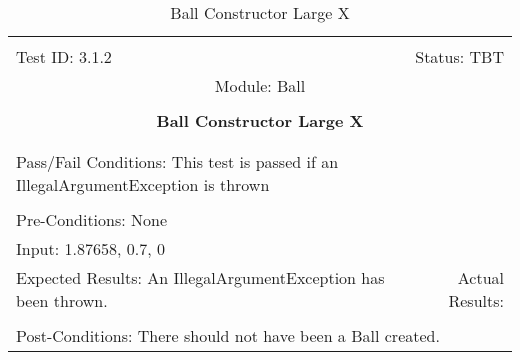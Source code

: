 \documentclass[titlepage]{article}
\begin{document}
\begin{center}%
\begin{table}
\begin{tabular}{|l r|}\hline&\\[-2mm]
	Test ID: 3.1.2	&Status: TBT\\[-3mm]
	\multicolumn{2}{|c|}{Module: Ball}\\&\\
	\multicolumn{2}{|c|}{\textbf{\large{Ball Constructor Large X}}}\\&\\\hline&\\[-3mm]
	\multicolumn{2}{|p{\textwidth}|}{Pass/Fail Conditions: This test is passed if an IllegalArgumentException is thrown}\\[1mm]\hline&\\[-3mm]
	\multicolumn{2}{|p{\textwidth}|}{Pre-Conditions: None}\\[4mm]
	\multicolumn{2}{|p{\textwidth}|}{Input: 1.87658, 0.7, 0}\\[2mm]\hline
	\multicolumn{1}{|p{0.49\textwidth}}{Expected Results: An IllegalArgumentException has been thrown.}	&\multicolumn{1}{|p{0.45\textwidth}|}{Actual Results:}\\\hline&\\[-3mm]
	\multicolumn{2}{|p{\textwidth}|}{Post-Conditions: There should not have been a Ball created.}\\\hline
\end{tabular}
\caption{Ball Constructor Large X}
\end{table}
\end{center}
\end{document}
